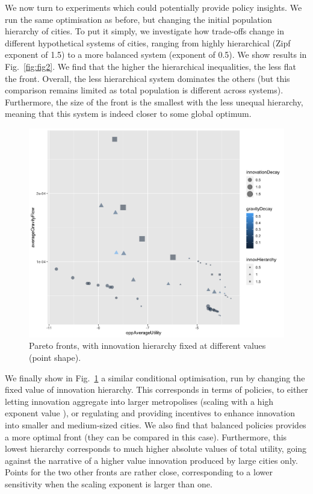 \documentclass{article}
\begin{document}
We now turn to experiments which could potentially provide policy insights. We run the same optimisation as before, but changing the initial population hierarchy of cities. To put it simply, we investigate how trade-offs change in different hypothetical systems of cities, ranging from highly hierarchical (Zipf exponent of 1.5) to a more balanced system (exponent of 0.5). We show results in Fig.~\ref{fig:fig2}. We find that the higher the hierarchical inequalities, the less flat the front. Overall, the less hierarchical system dominates the others (but this comparison remains limited as total population is different across systems). Furthermore, the size of the front is the smallest with the less unequal hierarchy, meaning that this system is indeed closer to some global optimum.




\begin{figure}
	\centering
	\includegraphics[width=\linewidth]{figures/pareto-oppAverageUtility-averageGravityFlow_VARYINGINNOVHIERARCHY_color-gravityDecay_size-innovationDecay.png}
	\caption{Pareto fronts, with innovation hierarchy fixed at different values (point shape).\label{fig:fig3}}
\end{figure}

We finally show in Fig.~\ref{fig:fig3} a similar conditional optimisation, run by changing the fixed value of innovation hierarchy. This corresponds in terms of policies, to either letting innovation aggregate into larger metropolises (scaling with a high exponent value \cite{pumain2006evolutionary}), or regulating and providing incentives to enhance innovation into smaller and medium-sized cities. We also find that balanced policies provides a more optimal front (they can be compared in this case). Furthermore, this lowest hierarchy corresponds to much higher absolute values of total utility, going against the narrative of a higher value innovation produced by large cities only. Points for the two other fronts are rather close, corresponding to a lower sensitivity when the scaling exponent is larger than one.
\end{document}
